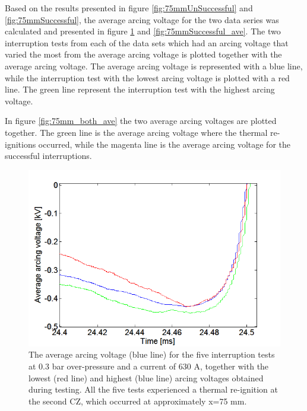 \documentclass[10pt,b5paper,twoside]{article}
\begin{document}
Based on the results presented in figure \ref{fig:75mmUnSuccessful} and \ref{fig:75mmSuccessful}, the average arcing voltage for the two data series was calculated and presented in figure \ref{fig:75mmUnSuccessful_ave} and \ref{fig:75mmSuccessful_ave}. The two interruption tests from each of the data sets which had an arcing voltage that varied the most from the average arcing voltage is plotted together with the average arcing voltage. The average arcing voltage is represented with a blue line, while the interruption test with the lowest arcing voltage is plotted with a red line. The green line represent the interruption test with the highest arcing voltage. 

In figure \ref{fig:75mm_both_ave} the two average arcing voltages are plotted together. The green line is the average arcing voltage where the thermal re-ignitions occurred, while the magenta line is the average arcing voltage for the successful interruptions.

\begin{figure}[H]
\centering
\includegraphics[scale=0.6, angle =0 ]{Bilder/Results/ArcingVoltage_75_reIgnition_average.PNG}
\caption{The average arcing voltage (blue line) for the five interruption tests at 0.3 bar over-pressure and a current of 630 A, together with the lowest (red line) and highest (blue line) arcing voltages obtained during testing. All the five tests experienced a thermal re-ignition at the second CZ, which occurred at approximately  x=75 mm.} \label{fig:75mmUnSuccessful_ave}
\end{figure}
\end{document}
